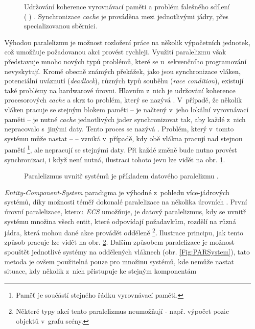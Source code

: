 \begin{figure}[H]
	\centering
	\caption{Udržování koherence vyrovnávací paměti a problém falešného sdílení ( \cite{FalseSharing}) . Synchronizace \emph{cache} je prováděna mezi jednotlivými jádry, přes specializovanou sběrnici.}
	\label{Fig:PARFalseSharing}
\end{figure}

Výhodou paralelizmu je možnost rozložení práce na několik výpočetních jednotek, což umožňuje požadovanou akci provést rychleji. Využití paralelizmu však představuje mnoho nových typů problémů, které se u~sekvenčního programování nevyskytují. Kromě obecně známých překážek, jako jsou synchronizace vláken, potenciální uváznutí (\emph{deadlock}), různých typů souběhu (\emph{race condition}), existují také problémy na hardwarové úrovni. Hlavním z~nich je udržování koherence procesorových \emph{cache} \cite{CacheCoherence} a skrz to problém, který se nazývá  \cite{FalseSharing}. V~případě, že několik vláken pracuje se stejným blokem paměti -- je načtený v~jeho lokální vyrovnávací paměti -- je nutné \emph{cache} jednotlivých jader synchronizovat tak, aby každé z~nich nepracovalo s~jinými daty. Tento proces se nazývá . Problém, který v~tomto systému může nastat --  -- vzniká v~případě, kdy obě vlákna pracují nad stejnou pamětí \footnote{Paměť je součástí stejného řádku vyrovnávací paměti.}, ale nepracují se stejnými daty. Při každé změně bude nutno provést synchronizaci, i když není nutná, ilustraci tohoto jevu lze vidět na obr. \ref{Fig:PARFalseSharing}.

\begin{figure}[H]
	\centering
	\caption{Paralelizmus uvnitř systémů je příkladem datového paralelizmu \cite{KindsOfParallelism}.}
	\label{Fig:PARData}
\end{figure}

\emph{Entity-Component-System} paradigma je výhodné z~pohledu více-jádrových systémů, díky možnosti téměř \cite{AmdahlLaw} dokonalé paralelizace na několika úrovních \cite{ParallelGame}. První úrovní paralelizace, kterou \emph{ECS} umožňuje, je datový paralelizmus, kdy se uvnitř systému množina všech entit, které odpovídají požadavkům, rozdělí na různá jádra, která mohou dané akce provádět odděleně \footnote{Některé typy akcí tento paralelizmus neumožňují - např. výpočet pozic objektů v~grafu scény.}. Ilustrace principu, jak tento způsob pracuje lze vidět na obr. \ref{Fig:PARData}. Dalším způsobem paralelizace je možnost spouštět jednotlivé systémy na oddělených vláknech (obr. \ref{Fig:PARSystem}), tato metoda je ovšem použitelná pouze pro množinu systémů, kde nemůže nastat situace, kdy několik z~nich přistupuje ke stejným komponentám 


